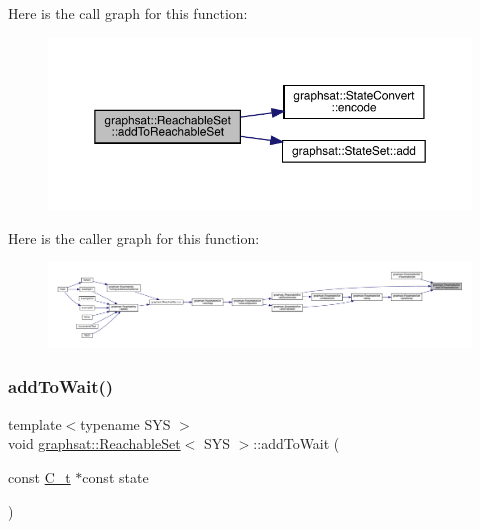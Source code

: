Here is the call graph for this function\+:
\nopagebreak
\begin{figure}[H]
\begin{center}
\leavevmode
\includegraphics[width=350pt]{classgraphsat_1_1_reachable_set_acee5be3f5d294e0339c4bf3b9e690f51_cgraph}
\end{center}
\end{figure}
Here is the caller graph for this function\+:
\nopagebreak
\begin{figure}[H]
\begin{center}
\leavevmode
\includegraphics[width=350pt]{classgraphsat_1_1_reachable_set_acee5be3f5d294e0339c4bf3b9e690f51_icgraph}
\end{center}
\end{figure}
\mbox{\label{classgraphsat_1_1_reachable_set_abcc03556aa2864cdc4b2c1e709b96111}} 
\subsubsection{\texorpdfstring{addToWait()}{addToWait()}}
{\footnotesize\ttfamily template$<$typename S\+YS $>$ \\
void \mbox{\hyperlink{classgraphsat_1_1_reachable_set}{graphsat\+::\+Reachable\+Set}}$<$ S\+YS $>$\+::add\+To\+Wait (\begin{DoxyParamCaption}\item[{const \mbox{\hyperlink{classgraphsat_1_1_reachable_set_a0b7981a216ec4c46be913e08d5f0cd07}{C\+\_\+t}} $\ast$const}]{state }\end{DoxyParamCaption})\hspace{0.3cm}{\ttfamily [inline]}}

